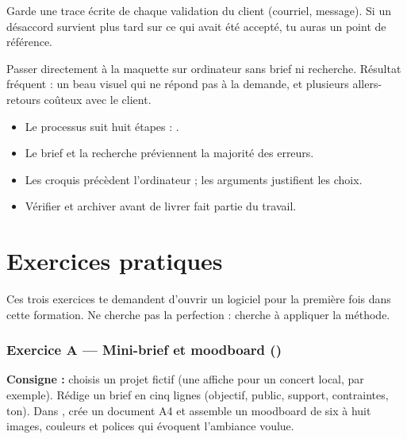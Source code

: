 \begin{astuce}
Garde une trace écrite de chaque validation du client (courriel, message). Si un désaccord survient plus tard sur ce qui avait été accepté, tu auras un point de référence.
\end{astuce}

\begin{erreur}
Passer directement à la maquette sur ordinateur sans brief ni recherche. Résultat fréquent : un beau visuel qui ne répond pas à la demande, et plusieurs allers-retours coûteux avec le client.
\end{erreur}

\begin{retenir}
\begin{itemize}
    \item Le processus suit huit étapes : .
    \item Le brief et la recherche préviennent la majorité des erreurs.
    \item Les croquis précèdent l'ordinateur ; les arguments justifient les choix.
    \item Vérifier et archiver avant de livrer fait partie du travail.
\end{itemize}
\end{retenir}

\section*{Exercices pratiques}

Ces trois exercices te demandent d'ouvrir un logiciel pour la première fois dans cette formation. Ne cherche pas la perfection : cherche à appliquer la méthode.

\subsubsection*{Exercice A --- Mini-brief et moodboard ()}

\textbf{Consigne :} choisis un projet fictif (une affiche pour un concert local, par exemple). Rédige un brief en cinq lignes (objectif, public, support, contraintes, ton). Dans , crée un document A4 et assemble un moodboard de six à huit images, couleurs et polices qui évoquent l'ambiance voulue.

